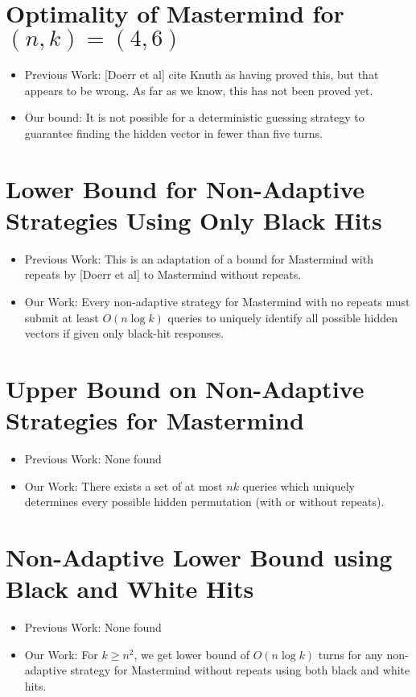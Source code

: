 \documentclass[12pt, a4paper]{article}
\begin{document}
\section*{Optimality of Mastermind for $(n, k) = (4, 6)$}
	\begin{itemize}
	\item Previous Work: [Doerr et al] cite Knuth as having proved this, but that appears to be wrong. As far as we know, this has not been proved yet.
	\item Our bound: It is not
	possible for a deterministic guessing strategy to guarantee finding the
	hidden vector in fewer than five turns.

	\end{itemize}
\clearpage
\section*{Lower Bound for Non-Adaptive Strategies Using Only Black Hits}

\begin{itemize}
	\item Previous Work: This is an adaptation of a bound for Mastermind with repeats by [Doerr et al] to Mastermind without repeats.
	\item Our Work: Every non-adaptive strategy for Mastermind with no repeats must submit at least
$O(n \log k)$ queries to uniquely identify all possible hidden vectors if given only black-hit responses.
\end{itemize}

\section*{Upper Bound on Non-Adaptive Strategies for Mastermind}
\begin{itemize}
	\item Previous Work: None found
	\item Our Work: There exists a set of at most $n k$ queries which uniquely determines every
possible hidden permutation (with or without repeats).
\end{itemize}

\section*{Non-Adaptive Lower Bound using Black and White Hits}
\begin{itemize}
	\item Previous Work: None found
	\item Our Work: For $k \ge n^2$, we get lower bound of $O(n\log k)$ turns for any non-adaptive strategy for
Mastermind without repeats using both black and white hits.
\end{itemize}
\end{document}
